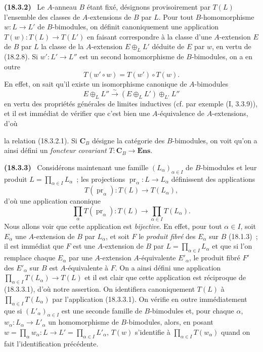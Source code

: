 \documentclass[10pt,oneside]{book}
\makeatletter
\newcommand{\setmanualcurrentlabel}[1]{\def\@currentlabel{#1}}
\newcommand{\oldpage}[2][]{%
  \setcounter{footnote}{0}%
  \marginpar{\scriptsize\textbf{#1}~|~#2}\ignorespaces}
\newenvironment{env}[1][]{\setmanualcurrentlabel{#1}\par\medskip\noindent\textbf{(#1)}\ }{\par}
\makeatother
\begin{document}
\begin{env}[18.3.2]
\label{0.18.3.2-fr}
Le $A$-anneau $B$ étant fixé, désignons provisoirement par $T(L)$ l'ensemble
des classes de $A$-extensions de $B$ par $L$. Pour tout $B$-homomorphisme
$w:L\to L'$ de $B$-bimodules, on définit canoniquement une application
$T(w):T(L)\to T(L')$ en faisant correspondre à la classe d'une $A$-extension
$E$ de $B$ par $L$ la classe de la $A$-extension $E\oplus_LL'$ déduite de $E$
par $w$, en vertu de (18.2.8). Si $w':L'\to L''$ est un second homomorphisme
de $B$-bimodules, on a en outre
\begin{equation}
\label{0.18.3.2.1-fr}
\tag{18.3.2.1}
  T(w'\circ w)=T(w')\circ T(w).
\end{equation}
En effet, on sait qu'il existe un isomorphisme canonique de $A$-bimodules
\[
  E\oplus_LL''\xrightarrow{\sim}(E\oplus_LL')\oplus_{L'}L''
\]
en vertu des propriétés générales de limites inductives (cf. par exemple
($\mathrm{I}$, 3.3.9)), et il est immédiat de vérifier que c'est bien une
$A$-équivalence de $A$-extensions, d'où

\oldpage[0\textsubscript{IV-1}]{60}

la relation (18.3.2.1). Si $\mathbf C_B$ désigne la catégorie des
$B$-bimodules, on voit qu'on a ainsi défini un \emph{foncteur covariant}
$T:\mathbf C_B\to\mathbf{Ens}$.
\end{env}

\begin{env}[18.3.3]
\label{0.18.3.3-fr}
Considérons maintenant une famille $(L_\alpha)_{\alpha\in I}$ de
$B$-bimodules et leur produit $L=\prod_{\alpha\in I}L_\alpha$~; les
projections $\operatorname{pr}_\alpha:L\to L_\alpha$ définissent des
applications
\[
  T(\operatorname{pr}_\alpha):T(L)\to T(L_\alpha),
\]
d'où une application canonique
\begin{equation}
\label{0.18.3.3.1-fr}
\tag{18.3.3.1}
  \prod_\alpha T(\operatorname{pr}_\alpha):T(L)
  \longrightarrow\prod_{\alpha\in I}T(L_\alpha).
\end{equation}
Nous allons voir que cette application est \emph{bijective}. En effet, pour
tout $\alpha\in I$, soit $E_\alpha$ une $A$-extension de $B$ par $L_\alpha$,
et soit $F$ le \emph{produit fibré} des $E_\alpha$ sur $B$ (18.1.3)~; il est
immédiat que $F$ est une $A$-extension de $B$ par
$L=\prod_{\alpha\in I}L_\alpha$ et que si l'on remplace chaque $E_\alpha$ par
une $A$-extension $A$-équivalente $E'_\alpha$, le produit fibré $F'$ des
$E'_\alpha$ sur $B$ est $A$-équivalente à $F$. On a ainsi défini une
application $\prod_{\alpha\in I}T(L_\alpha)\to T(L)$ et il est clair que cette
application est réciproque de (18.3.3.1), d'où notre assertion. On identifiera
canoniquement $T(L)$ à $\prod_{\alpha\in I}T(L_\alpha)$ par l'application
(18.3.3.1). On vérifie en outre immédiatement que si
$(L'_\alpha)_{\alpha\in I}$ est une seconde famille de $B$-bimodules et, pour
chaque $\alpha$, $w_\alpha:L_\alpha\to L'_\alpha$ un homomorphisme de
$B$-bimodules, alors, en posant
$w=\prod_\alpha w_\alpha:L\to L'=\prod_{\alpha\in I}L'_\alpha$, $T(w)$
s'identifie à $\prod_{\alpha\in I}T(w_\alpha)$ quand on fait l'identification
précédente.
\end{env}
\end{document}
